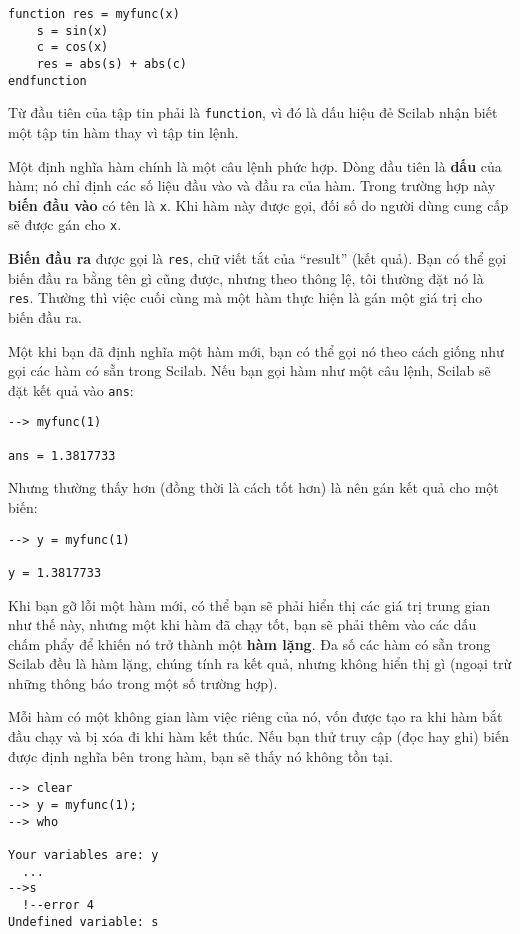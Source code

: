 \documentclass[12pt]{book}
\begin{document}
\begin{verbatim}
function res = myfunc(x)
    s = sin(x)
    c = cos(x)
    res = abs(s) + abs(c)
endfunction
\end{verbatim}

Từ đầu tiên của tập tin phải là {\tt function}, vì đó là dấu hiệu đẻ
Scilab nhận biết một tập tin hàm thay vì tập tin lệnh.

Một định nghĩa hàm chính là một câu lệnh phức hợp. Dòng đầu tiên là
{\bf dấu} của hàm; nó chỉ định các số liệu đầu vào và đầu ra của hàm. 
Trong trường hợp này {\bf biến đầu vào} có tên là {\tt x}. Khi hàm này
được gọi, đối số do người dùng cung cấp sẽ được gán cho {\tt x}.

{\bf Biến đầu ra} được gọi là {\tt res}, chữ viết tắt của ``result''
(kết quả). Bạn có thể gọi biến đầu ra bằng tên gì cũng được, nhưng
theo thông lệ, tôi thường đặt nó là {\tt res}.  Thường thì việc cuối
cùng mà một hàm thực hiện là gán một giá trị cho biến đầu ra.

Một khi bạn đã định nghĩa một hàm mới, bạn có thể gọi nó theo cách
giống như gọi các hàm có sẵn trong Scilab. Nếu bạn gọi hàm như một
câu lệnh, Scilab sẽ đặt kết quả vào {\tt ans}:

\begin{verbatim}
--> myfunc(1)

ans = 1.3817733
\end{verbatim}

Nhưng thường thấy hơn (đồng thời là cách tốt hơn) là nên gán 
kết quả cho một biến:

\begin{verbatim}
--> y = myfunc(1)

y = 1.3817733
\end{verbatim}

Khi bạn gỡ lỗi một hàm mới, có thể bạn sẽ phải hiển thị các
giá trị trung gian như thế này, nhưng một khi hàm đã chạy tốt, bạn
sẽ phải thêm vào các dấu chấm phẩy để khiến nó trở thành một 
{\bf hàm lặng}. Đa số các hàm có sẵn trong Scilab đều là hàm lặng,
chúng tính ra kết quả, nhưng không hiển thị gì (ngoại trừ những
thông báo trong một số trường hợp).

Mỗi hàm có một không gian làm việc riêng của nó, vốn được tạo ra khi
hàm bắt đầu chạy và bị xóa đi khi hàm kết thúc. Nếu bạn thử 
truy cập (đọc hay ghi) biến được định nghĩa bên trong hàm, bạn sẽ
thấy nó không tồn tại.

\begin{verbatim}
--> clear
--> y = myfunc(1);
--> who

Your variables are: y
  ...
-->s
  !--error 4 
Undefined variable: s
\end{verbatim}
\end{document}
